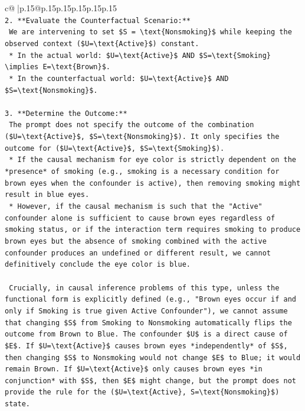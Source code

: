 \documentclass{article}
\begin{document}
{\begin{supertabular}{c@{$\;$}|p{.15\linewidth}@{}p{.15\linewidth}p{.15\linewidth}p{.15\linewidth}p{.15\linewidth}p{.15\linewidth}}
{{{\\ 
\texttt{2.  **Evaluate the Counterfactual Scenario:**} \\
\texttt{    We are intervening to set \$S = \textbackslash{}text\{Nonsmoking\}\$ while keeping the observed context (\$U=\textbackslash{}text\{Active\}\$) constant.} \\
\texttt{    *   In the actual world: \$U=\textbackslash{}text\{Active\}\$ AND \$S=\textbackslash{}text\{Smoking\} \textbackslash{}implies E=\textbackslash{}text\{Brown\}\$.} \\
\texttt{    *   In the counterfactual world: \$U=\textbackslash{}text\{Active\}\$ AND \$S=\textbackslash{}text\{Nonsmoking\}\$.} \\
\\ 
\texttt{3.  **Determine the Outcome:**} \\
\texttt{    The prompt does not specify the outcome of the combination (\$U=\textbackslash{}text\{Active\}\$, \$S=\textbackslash{}text\{Nonsmoking\}\$). It only specifies the outcome for (\$U=\textbackslash{}text\{Active\}\$, \$S=\textbackslash{}text\{Smoking\}\$).} \\
\texttt{    *   If the causal mechanism for eye color is strictly dependent on the *presence* of smoking (e.g., smoking is a necessary condition for brown eyes when the confounder is active), then removing smoking might result in blue eyes.} \\
\texttt{    *   However, if the causal mechanism is such that the "Active" confounder alone is sufficient to cause brown eyes regardless of smoking status, or if the interaction term requires smoking to produce brown eyes but the absence of smoking combined with the active confounder produces an undefined or different result, we cannot definitively conclude the eye color is blue.} \\
\\ 
\texttt{    Crucially, in causal inference problems of this type, unless the functional form is explicitly defined (e.g., "Brown eyes occur if and only if Smoking is true given Active Confounder"), we cannot assume that changing \$S\$ from Smoking to Nonsmoking automatically flips the outcome from Brown to Blue. The confounder \$U\$ is a direct cause of \$E\$. If \$U=\textbackslash{}text\{Active\}\$ causes brown eyes *independently* of \$S\$, then changing \$S\$ to Nonsmoking would not change \$E\$ to Blue; it would remain Brown. If \$U=\textbackslash{}text\{Active\}\$ only causes brown eyes *in conjunction* with \$S\$, then \$E\$ might change, but the prompt does not provide the rule for the (\$U=\textbackslash{}text\{Active\}, S=\textbackslash{}text\{Nonsmoking\}\$) state.} \\
}}}
\end{supertabular}}
\end{document}
